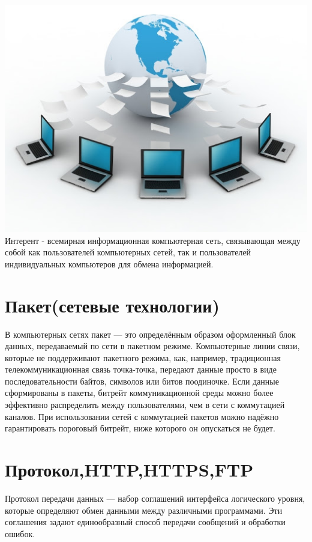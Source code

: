 \documentclass[a4paper,14pt]{extarticle}
\begin{document}
\includegraphics[width=1\linewidth]{net.jpg}
Интерент - всемирная информационная компьютерная сеть, связывающая между собой как пользователей компьютерных сетей, так и пользователей индивидуальных компьютеров для обмена информацией.
\label{fig:mpr}


\section{Пакет(сетевые технологии)}
В компьютерных сетях пакет — это определённым образом оформленный блок данных, передаваемый по сети в пакетном режиме. Компьютерные линии связи, которые не поддерживают пакетного режима, как, например, традиционная телекоммуникационная связь точка-точка, передают данные просто в виде последовательности байтов, символов или битов поодиночке. Если данные сформированы в пакеты, битрейт коммуникационной среды можно более эффективно распределить между пользователями, чем в сети с коммутацией каналов. При использовании сетей с коммутацией пакетов можно надёжно гарантировать пороговый битрейт, ниже которого он опускаться не будет.

\newpage

\section{Протокол,HTTP,HTTPS,FTP}
Протокол передачи данных — набор соглашений интерфейса логического уровня, которые определяют обмен данными между различными программами. Эти соглашения задают единообразный способ передачи сообщений и обработки ошибок.\newline
\end{document}
